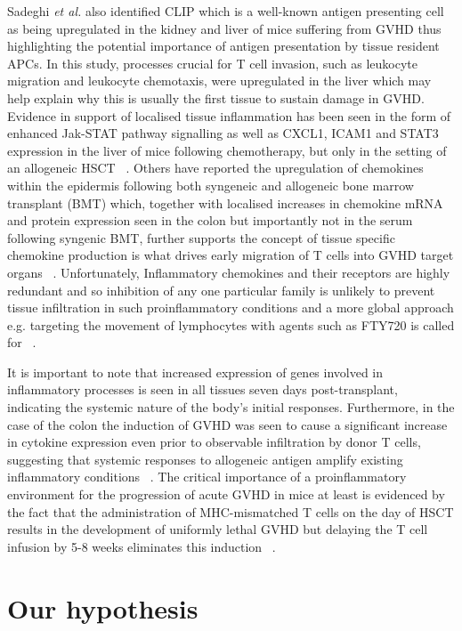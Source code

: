 Sadeghi \textit{et al.} also identified CLIP which is a well-known antigen presenting cell as being upregulated in the kidney and liver of mice suffering from GVHD thus highlighting the potential importance of antigen presentation by tissue resident APCs. In this study, processes crucial for T cell invasion, such as leukocyte migration and leukocyte chemotaxis, were upregulated in the liver which may help explain why this is usually the first tissue to sustain damage in GVHD. Evidence in support of localised tissue inflammation has been seen in the form of enhanced Jak-STAT pathway signalling as well as CXCL1, ICAM1 and STAT3 expression in the liver of mice following chemotherapy, but only in the setting of an allogeneic HSCT ~\autocite{Sad2013}. Others have reported the upregulation of chemokines within the epidermis following both syngeneic and allogeneic bone marrow transplant (BMT) which, together with localised increases in chemokine mRNA and protein expression seen in the colon but importantly not in the serum following syngenic BMT, further supports the concept of tissue specific chemokine production is what drives early migration of T cells into GVHD target organs ~\autocite{Map2006}. Unfortunately, Inflammatory chemokines and their receptors are highly redundant and so inhibition of any one particular family is unlikely to prevent tissue infiltration in such proinflammatory conditions and a more global approach e.g. targeting the movement of lymphocytes with agents such as FTY720 is called for ~\autocite{Map2006}.
 
 It is important to note that increased expression of genes involved in inflammatory processes is seen in all tissues seven days post-transplant, indicating the systemic nature of the body's initial responses. Furthermore, in the case of the colon the induction of GVHD was seen to cause a significant increase in cytokine expression even prior to observable infiltration by donor T cells, suggesting that systemic responses to allogeneic antigen amplify existing inflammatory conditions ~\autocite{Map2006}. The critical importance of a proinflammatory environment for the progression of acute GVHD in mice at least is evidenced by the fact that the administration of MHC-mismatched T cells on the day of HSCT results in the development of uniformly lethal GVHD but delaying the T cell infusion by 5-8 weeks eliminates this induction ~\autocite{Map2006}.


\section{Our hypothesis}

